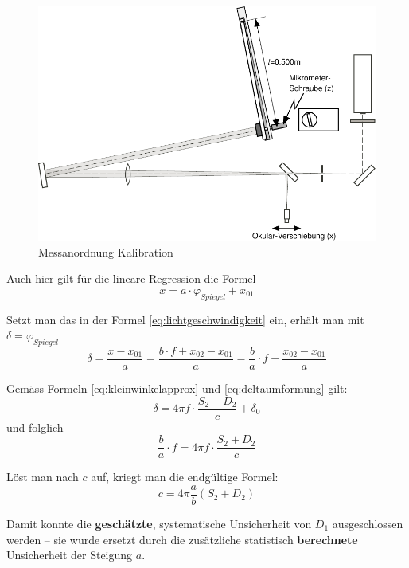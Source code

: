 \begin{figure}[H]
    \center
    \includegraphics[width=.8\textwidth]{images/kalibration.pdf}
    \caption{Messanordnung Kalibration}
    \label{fig:kalibration}
\end{figure}

Auch hier gilt f\"ur die lineare Regression die Formel
\begin{equation}
    x = a \cdot \varphi_{Spiegel} + x_{01}
\end{equation}

Setzt man das in der Formel  \ref{eq:lichtgeschwindigkeit} ein, erh\"alt man mit
$\delta = \varphi_{Spiegel}$
\begin{equation}
    \delta = \frac{x - x_{01}}{a} = \frac{b \cdot f + x_{02} - x_{01}}{a} = \frac{b}{a} \cdot f + \frac{x_{02}-x_{01}}{a}
\end{equation}

Gem\"ass Formeln \ref{eq:kleinwinkelapprox} und \ref{eq:deltaumformung} gilt:
\begin{equation}
    \delta = 4\pi f \cdot \frac{S_2 + D_2}{c} + \delta_0
\end{equation}
und folglich
\begin{equation}
    \frac{b}{a} \cdot f = 4\pi f \cdot \frac{S_2 + D_2}{c}
\end{equation}

L\"ost man nach $c$ auf, kriegt man die endg\"ultige Formel:
\begin{equation}
    c = 4\pi\frac{a}{b}(S_2 + D_2)
    \label{eq:lichtgeschwindigkeit_genauer}
\end{equation}

Damit konnte  die  \textbf{gesch\"atzte},  systematische  Unsicherheit von $D_1$
ausgeschlossen werden -- sie wurde ersetzt  durch  die zus\"atzliche statistisch
\textbf{berechnete} Unsicherheit der Steigung $a$.


